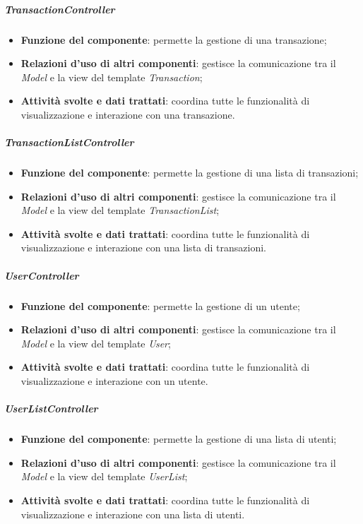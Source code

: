 \subparagraph{TransactionController}
\begin{itemize}
	\item \textbf{Funzione del componente}: permette la gestione di una transazione;
	\item \textbf{Relazioni d'uso di altri componenti}: gestisce la comunicazione tra il \textit{Model} e la view del template \textit{Transaction};
	\item \textbf{Attività svolte e dati trattati}: coordina tutte le funzionalità di visualizzazione e interazione con una transazione.
\end{itemize}

\subparagraph{TransactionListController}
\begin{itemize}
	\item \textbf{Funzione del componente}: permette la gestione di una lista di transazioni;
	\item \textbf{Relazioni d'uso di altri componenti}: gestisce la comunicazione tra il \textit{Model} e la view del template \textit{TransactionList};
	\item \textbf{Attività svolte e dati trattati}: coordina tutte le funzionalità di visualizzazione e interazione con una lista di transazioni.
\end{itemize}

\subparagraph{UserController}
\begin{itemize}
	\item \textbf{Funzione del componente}: permette la gestione di un utente;
	\item \textbf{Relazioni d'uso di altri componenti}: gestisce la comunicazione tra il \textit{Model} e la view del template \textit{User};
	\item \textbf{Attività svolte e dati trattati}: coordina tutte le funzionalità di visualizzazione e interazione con un utente.
\end{itemize}

\subparagraph{UserListController}
\begin{itemize}
	\item \textbf{Funzione del componente}: permette la gestione di una lista di utenti;
	\item \textbf{Relazioni d'uso di altri componenti}: gestisce la comunicazione tra il \textit{Model} e la view del template \textit{UserList};
	\item \textbf{Attività svolte e dati trattati}: coordina tutte le funzionalità di visualizzazione e interazione con una lista di utenti.
\end{itemize}

